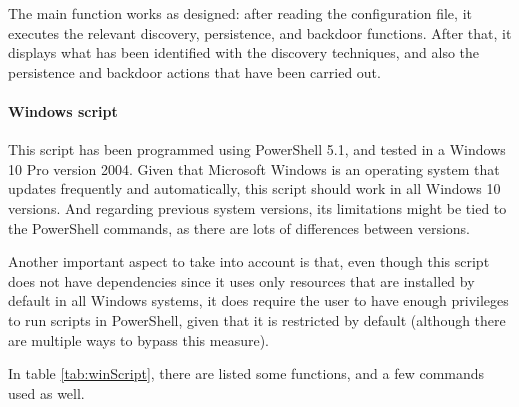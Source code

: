 The main function works as designed: after reading the configuration file, it executes the relevant discovery, persistence, and backdoor functions. After that, it displays what has been identified with the discovery techniques, and also the persistence and backdoor actions that have been carried out.

\pagebreak
\paragraph{Windows script}
This script has been programmed using PowerShell 5.1, and tested in a Windows 10 Pro version 2004. Given that Microsoft Windows is an operating system that updates frequently and automatically, this script should work in all Windows 10 versions. And regarding previous system versions, its limitations might be tied to the PowerShell commands, as there are lots of differences between versions.

Another important aspect to take into account is that, even though this script does not have dependencies since it uses only resources that are installed by default in all Windows systems, it does require the user to have enough privileges to run scripts in PowerShell, given that it is restricted by default (although there are multiple ways to bypass this measure).

In table \ref{tab:winScript}, there are listed some functions, and a few commands used as well.

